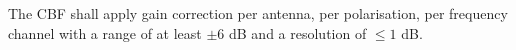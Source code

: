 The CBF shall apply gain correction per antenna, per polarisation, per
frequency channel with a range of at least $\pm 6$ dB and a resolution of $\le
1$ dB.
